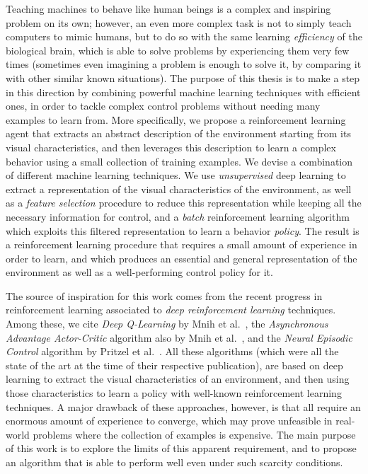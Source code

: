 Teaching machines to behave like human beings is a complex and inspiring problem
on its own; however, an even more complex task is not to simply teach computers 
to mimic humans, but to do so with the same learning \textit{efficiency} of the 
biological brain, which is able to solve problems by experiencing them very few 
times (sometimes even imagining a problem is enough to solve it, by comparing it 
with other similar known situations). 
The purpose of this thesis is to make a step in this direction by
combining powerful machine learning techniques with efficient ones, in order
to tackle complex control problems without needing many examples to learn
from.
More specifically, we propose a reinforcement learning agent that extracts an 
abstract description of the environment starting from its visual 
characteristics, and then leverages this description to learn a complex behavior
using a small collection of training examples.
We devise a combination of different machine learning techniques. We use 
\textit{unsupervised} deep learning to extract a representation of the visual 
characteristics of the environment, as well as a \textit{feature selection}
procedure to reduce this representation while keeping all the necessary information
for control, and a \textit{batch} reinforcement learning algorithm which exploits
this filtered representation to learn a behavior \textit{policy}.
The result is a reinforcement learning procedure that requires a small amount
of experience in order to learn, and which produces an essential and 
general representation of the environment as well as a well-performing control 
policy for it.

The source of inspiration for this work comes from the recent progress in 
reinforcement learning associated to \textit{deep reinforcement learning} 
techniques. 
Among these, we cite \textit{Deep Q-Learning} by Mnih et al.\ \cite{mnih2015human},
the \textit{Asynchronous Advantage Actor-Critic} algorithm also by Mnih et al.\ \cite{mnih2016asynchronous},
and the \textit{Neural Episodic Control} algorithm by Pritzel et al.\ \cite{pritzel2017neural}.
All these algorithms (which were all the state of the art at the time of
their respective publication), are based on deep learning to extract 
the visual characteristics of an environment, and then using those characteristics
to learn a policy with well-known reinforcement learning 
techniques. A major drawback of these approaches, however, is that all require
an enormous amount of experience to converge, which may prove unfeasible in 
real-world problems where the collection of examples is expensive.
The main purpose of this work is to explore the limits of this apparent 
requirement, and to propose an algorithm that is able to perform well even under 
such scarcity conditions.

